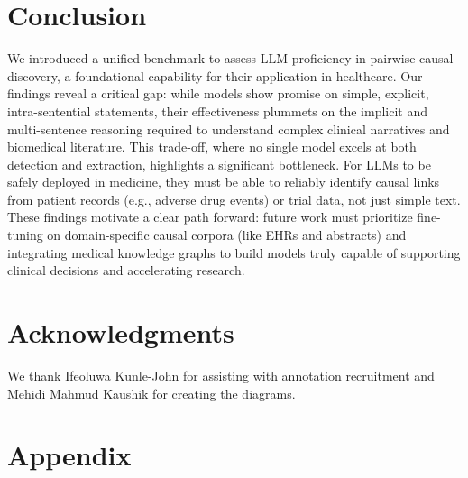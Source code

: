 \documentclass[conference]{IEEEtran}
\begin{document}


\section{Conclusion}
We introduced a unified benchmark to assess LLM proficiency in pairwise causal discovery, a foundational capability for their application in healthcare. Our findings reveal a critical gap: while models show promise on simple, explicit, intra-sentential statements, their effectiveness plummets on the implicit and multi-sentence reasoning required to understand complex clinical narratives and biomedical literature. This trade-off, where no single model excels at both detection and extraction, highlights a significant bottleneck. For LLMs to be safely deployed in medicine, they must be able to reliably identify causal links from patient records (e.g., adverse drug events) or trial data, not just simple text. These findings motivate a clear path forward: future work must prioritize fine-tuning on domain-specific causal corpora (like EHRs and abstracts) and integrating medical knowledge graphs to build models truly capable of supporting clinical decisions and accelerating research. 
 
\section{Acknowledgments}
We thank  Ifeoluwa Kunle-John for assisting with annotation recruitment and Mehidi Mahmud Kaushik for creating the diagrams.






\section*{Appendix}
\end{document}
